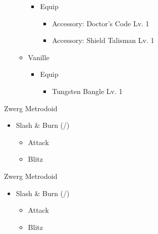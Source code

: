 \begin{paracol}{2}
\begin{menu}
\begin{itemize}
\begin{itemize}
				      \begin{itemize}
					      \item Equip
					            \begin{itemize}
						            \item Accessory: Doctor's Code Lv. 1
						            \item Accessory: Shield Talisman Lv. 1
					            \end{itemize}
				      \end{itemize}
				\item Vanille
				      \begin{itemize}
					      \item Equip
					            \begin{itemize}
						            \item Tungsten Bangle Lv. 1
					            \end{itemize}
				      \end{itemize}
			\end{itemize}
		\end{itemize}
	\end{menu}
	\switchcolumn*
	\renewcommand{\first}{[1] Slash \& Burn (\com/\rav)}
	\renewcommand{\second}{[2] War \& Peace (\com/\med)}
	\renewcommand{\third}{[3] Tide Turner (\syn/\sab)}
	\renewcommand{\fourth}{[4] }
	\renewcommand{\fifth}{[5] Undermine (\rav/\sab)}
	\renewcommand{\sixth}{[6] Divide \& Conquer (\com/\sab)}

	\begin{battle}{Zwerg Metrodoid}
		\begin{itemize}
			\item \first
			      \begin{itemize}
				      \item Attack
				      \item Blitz
			      \end{itemize}
		\end{itemize}
	\end{battle}

	\switchcolumn
	\begin{battle}{Zwerg Metrodoid}
		\begin{itemize}
			\item \first
			      \begin{itemize}
				      \item Attack
				      \item Blitz
			      \end{itemize}
		\end{itemize}
	\end{battle}


\end{paracol}
